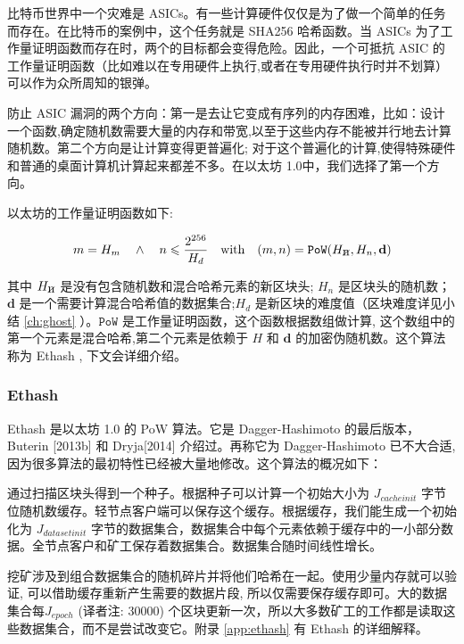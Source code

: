 \documentclass[9pt,oneside]{amsart}
\newcommand{\hcancel}[1]{%
    \tikz[baseline=(tocancel.base)]{
        \node[inner sep=0pt,outer sep=0pt] (tocancel) {#1};
        \draw[black] (tocancel.south west) -- (tocancel.north east);
    }%
}%
\begin{document}
\begin{multicols}{2}
比特币世界中一个灾难是 ASICs。有一些计算硬件仅仅是为了做一个简单的任务而存在。在比特币的案例中，这个任务就是 SHA256 哈希函数。当 ASICs 为了工作量证明函数而存在时，两个的目标都会变得危险。因此，一个可抵抗 ASIC 的工作量证明函数（比如难以在专用硬件上执行,或者在专用硬件执行时并不划算）可以作为众所周知的银弹。

防止 ASIC 漏洞的两个方向：第一是去让它变成有序列的内存困难，比如：设计一个函数,确定随机数需要大量的内存和带宽,以至于这些内存不能被并行地去计算随机数。第二个方向是让计算变得更普遍化; 对于这个普遍化的计算,使得特殊硬件和普通的桌面计算机计算起来都差不多。在以太坊 1.0中，我们选择了第一个方向。

以太坊的工作量证明函数如下:

\begin{equation}
m = H_m \quad \wedge \quad n \leqslant \frac{2^{256}}{H_d} \quad \text{with} \quad (m, n) = \mathtt{PoW}(H_{\hcancel{n}}, H_n, \mathbf{d})
\end{equation}

其中 $H_{\hcancel{n}}$ 是没有包含随机数和混合哈希元素的新区块头; $H_n$ 是区块头的随机数；$\mathbf{d}$ 是一个需要计算混合哈希值的数据集合;$H_d$ 是新区块的难度值（区块难度详见小结 \ref{ch:ghost} ）。$\mathtt{PoW}$ 是工作量证明函数，这个函数根据数组做计算, 这个数组中的第一个元素是混合哈希,第二个元素是依赖于 $H$ 和 $\mathbf{d}$ 的加密伪随机数。这个算法称为 Ethash , 下文会详细介绍。

\subsubsection{Ethash}

Ethash 是以太坊 1.0 的 PoW 算法。它是 Dagger-Hashimoto 的最后版本，Buterin
 [2013b] 和 Dryja[2014] 介绍过。再称它为 Dagger-Hashimoto 已不大合适, 因为很多算法的最初特性已经被大量地修改。这个算法的概况如下：

通过扫描区块头得到一个种子。根据种子可以计算一个初始大小为 $J_{cacheinit}$ 字节位随机数缓存。轻节点客户端可以保存这个缓存。根据缓存，我们能生成一个初始化为 $J_{datasetinit}$ 字节的数据集合，数据集合中每个元素依赖于缓存中的一小部分数据。全节点客户和矿工保存着数据集合。数据集合随时间线性增长。

挖矿涉及到组合数据集合的随机碎片并将他们哈希在一起。使用少量内存就可以验证, 可以借助缓存重新产生需要的数据片段, 所以仅需要保存缓存即可。大的数据集合每$J_{epoch}$ (译者注: 30000) 个区块更新一次，所以大多数矿工的工作都是读取这些数据集合，而不是尝试改变它。附录 \ref{app:ethash} 有 Ethash 的详细解释。


\end{multicols}
\end{document}

